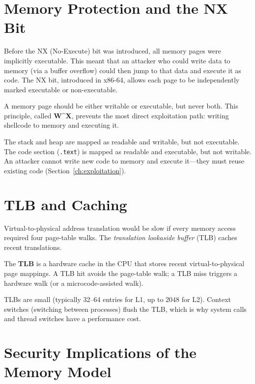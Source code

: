 \section{Memory Protection and the NX Bit}

Before the NX (No-Execute) bit was introduced, all memory pages were implicitly executable. This meant that an attacker who could write data to memory (via a buffer overflow) could then jump to that data and execute it as code. The NX bit, introduced in x86-64, allows each page to be independently marked executable or non-executable.

\begin{principle}
	A memory page should be either writable or executable, but never both. This principle, called \textbf{W\textasciicircum X}, prevents the most direct exploitation path: writing shellcode to memory and executing it.
\end{principle}

The stack and heap are mapped as readable and writable, but not executable. The code section (\texttt{.text}) is mapped as readable and executable, but not writable. An attacker cannot write new code to memory and execute it---they must reuse existing code (Section~\ref{ch:exploitation}).

\section{TLB and Caching}

Virtual-to-physical address translation would be slow if every memory access required four page-table walks. The \emph{translation lookaside buffer} (TLB) caches recent translations.

\begin{definition}[TLB]
	The \textbf{TLB} is a hardware cache in the CPU that stores recent virtual-to-physical page mappings. A TLB hit avoids the page-table walk; a TLB miss triggers a hardware walk (or a microcode-assisted walk).
\end{definition}

TLBs are small (typically 32--64 entries for L1, up to 2048 for L2). Context switches (switching between processes) flush the TLB, which is why system calls and thread switches have a performance cost.

\section{Security Implications of the Memory Model}

